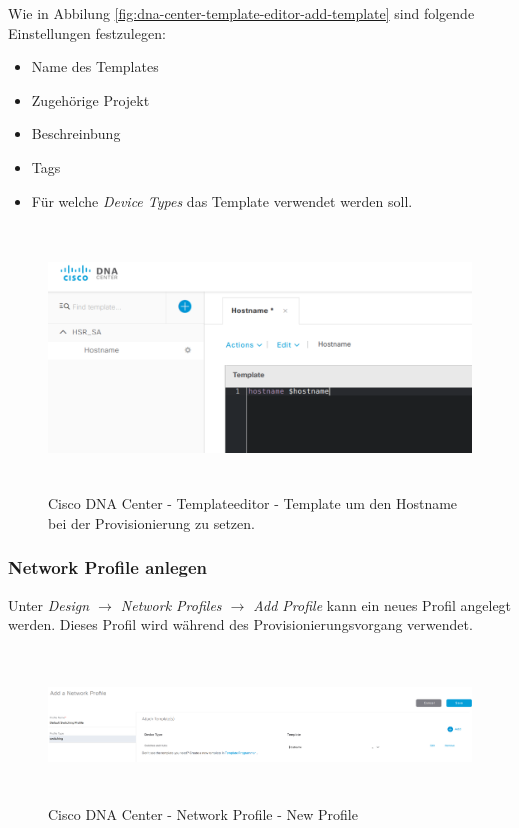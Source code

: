 Wie in Abbilung \ref{fig:dna-center-template-editor-add-template} sind folgende Einstellungen festzulegen:
\begin{itemize}
	\item Name des Templates
	\item Zugehörige Projekt
	\item Beschreinbung
	\item Tags
	\item Für welche \textit{Device Types} das Template verwendet werden soll.
\end{itemize}

\begin{figure}[H]
	\centering
	\includegraphics[height=7cm]{img/secondtry/dna-center-template-editor-edit.png}
	\caption{Cisco DNA Center - Templateeditor - Template um den Hostname bei der Provisionierung zu setzen.}
	\label{fig:dna-center-template-editor-edit}
\end{figure}

\subsubsection{Network Profile anlegen}
Unter \textit{Design $\rightarrow$ Network Profiles $\rightarrow$ Add Profile} kann ein neues Profil angelegt werden. Dieses Profil wird während des Provisionierungsvorgang verwendet. 

\begin{figure}[H]
	\centering
	\includegraphics[height=4cm]{img/secondtry/dna-center-network-profile-new.png}
	\caption{Cisco DNA Center - Network Profile - New Profile}
	\label{fig:dna-center-network-profile-new}
\end{figure}

